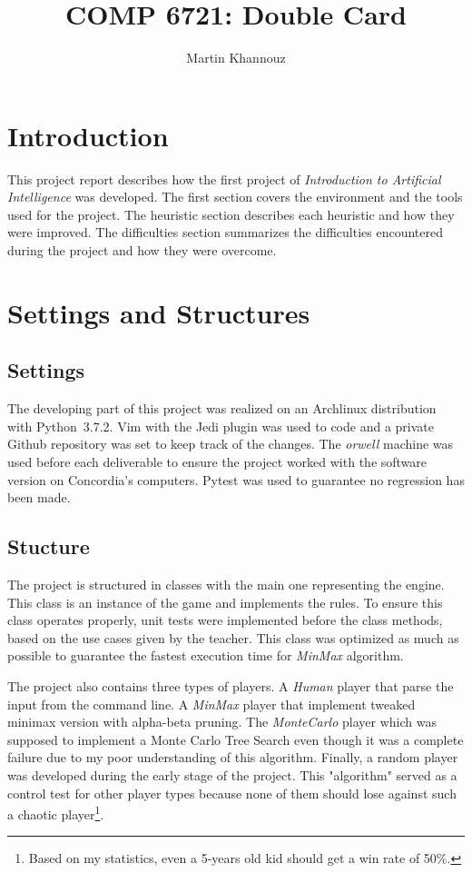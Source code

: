 \documentclass[runningheads]{llncs}
\begin{document}
%
\title{COMP 6721: Double Card}
\author{Martin Khannouz}
%
%
\maketitle              %
%
\section*{Introduction}
This project report describes how the first
project of \textit{Introduction to Artificial
Intelligence} was developed. The first section
covers the environment and the tools used for the
project. The heuristic section describes each
heuristic and how they were improved. The
difficulties section summarizes the difficulties
encountered during the project and how they were
overcome.

\section{Settings and Structures}
\subsection{Settings}
The developing part of this project was realized
on an Archlinux distribution with Python~3.7.2.
Vim with the Jedi plugin was used to code and a private Github repository was set to
keep track of the changes.
The \textit{orwell} machine was used before each
deliverable to ensure the project worked with the
software version on Concordia's computers. Pytest
was used to guarantee no regression has been made.

\subsection{Stucture}
The project is structured in classes with
the main one representing the engine. This class is an
instance of the game and implements the rules.
To ensure this class operates properly, unit tests
were implemented before the class methods, based on
the use cases given by the teacher.
This class was optimized as much as possible to
guarantee the fastest execution time for
\textit{MinMax} algorithm.

The project also contains three types of players. A
\textit{Human} player that parse the input from the command
line. A \textit{MinMax} player that implement tweaked
minimax version with alpha-beta pruning. The
\textit{MonteCarlo} player which was supposed to implement
a Monte Carlo Tree Search even though it was a
complete failure due to my poor understanding of
this algorithm. Finally, a random player was
developed during the early stage of the project.
This "algorithm" served as a control test for other
player types because none of them should lose
against such a chaotic player\footnote{Based on my
statistics, even a 5-years old kid should get a
win rate of 50\%.}.
\end{document}
